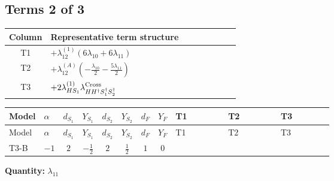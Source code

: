 \documentclass[8pt]{article}
\begin{document}
\begin{landscape}
\subsection*{Terms 2 of 3}
\begin{center}
\begin{tabular}{@{}c >{\raggedright\arraybackslash}p{0.82\linewidth}@{}}
\toprule
Column & Representative term structure \\
\midrule
T1 & \(\displaystyle +{\lambda_{12}^{(1)}} (6 {\lambda_{10}}+6 {\lambda_{11}})\) \\
\midrule
T2 & \(\displaystyle +{\lambda_{12}^{(A)}} \left(-\frac{{\lambda_{10}}}{2}-\frac{5 {\lambda_{11}}}{2}\right)\) \\
\midrule
T3 & \(\displaystyle +2 {\lambda_{HS_1}^{(1)}} {\lambda_{H H^\dagger S_1^\dagger S_2^\dagger}^{\rm Cross}}\) \\
\midrule
\bottomrule
\end{tabular}
\end{center}
\smallskip
\tiny
\begin{longtable}{@{}llcccccc >{\raggedright\arraybackslash}p{0.21\linewidth} >{\raggedright\arraybackslash}p{0.21\linewidth} >{\raggedright\arraybackslash}p{0.21\linewidth}@{}}
\toprule
Model & $\alpha$ & $d_{S_1}$ & $Y_{S_1}$ & $d_{S_2}$ & $Y_{S_2}$ & $d_F$ & $Y_F$ & T1 & T2 & T3 \\
\midrule
\endfirsthead
\toprule
Model & $\alpha$ & $d_{S_1}$ & $Y_{S_1}$ & $d_{S_2}$ & $Y_{S_2}$ & $d_F$ & $Y_F$ & T1 & T2 & T3 \\
\midrule
\endhead
T3-B & $-1$ & $2$ & $-\frac{1}{2}$ & $2$ & $\frac{1}{2}$ & $1$ & $0$ & \scriptsize\adjustbox{max width=\linewidth}{$\begin{gathered} +{\lambda_{12}^{(1)}} (6 {\lambda_{10}}+6 {\lambda_{11}})\end{gathered}$} & \scriptsize\adjustbox{max width=\linewidth}{$\begin{gathered} +{\lambda_{12}^{(A)}} \left(-\frac{{\lambda_{10}}}{2}-\frac{5 {\lambda_{11}}}{2}\right)\end{gathered}$} & \scriptsize\adjustbox{max width=\linewidth}{$\begin{gathered} +2 {\lambda_{HS_1}^{(1)}} {\lambda_{H H^\dagger S_1^\dagger S_2^\dagger}^{\rm Cross}}\end{gathered}$} \\
\midrule
\bottomrule
\end{longtable}
\clearpage
\noindent\textbf{Quantity: }$\lambda_{11}$\par\smallskip

\end{landscape}
\end{document}
